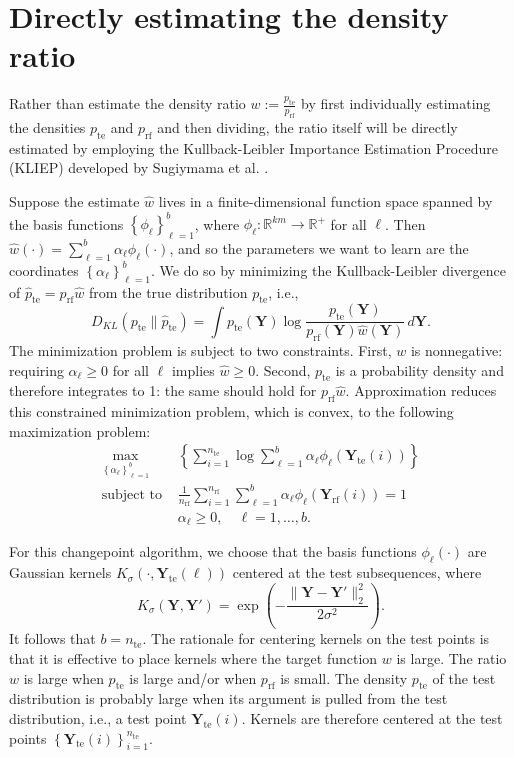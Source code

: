 \documentclass[12pt]{article}
\newcommand\prn[1]{\left( #1 \right)}
\newcommand\set[1]{\left\{ #1 \right\}}
\newcommand\RR{\mathbb{R}}
\newcommand\YY{{\boldsymbol{Y}}}
\newcommand\rf{{\mathrm{rf}}}
\newcommand\te{{\mathrm{te}}}
\begin{document}
\section{Directly estimating the density ratio}

Rather than estimate the density ratio $w:=\frac{p_\te}{p_\rf}$ by first individually estimating the densities $p_\te$ and $p_\rf$ and then dividing, the ratio itself will be directly estimated by employing the Kullback-Leibler Importance Estimation Procedure (KLIEP) developed by Sugiymama et al. \cite{sugiyama2008direct}.

Suppose the estimate $\hat w$ lives in a finite-dimensional function space spanned by the basis functions $\set{\phi_\ell}_{\ell=1}^b$,  where $\phi_\ell\colon\RR^{km}\to\RR^+$ for all $\ell$. Then $\hat w(\cdot)=\sum_{\ell=1}^b\alpha_\ell\phi_\ell(\cdot)$, and so the parameters we want to learn are the coordinates $\set{\alpha_\ell}_{\ell=1}^b$. We do so by minimizing the Kullback-Leibler divergence of $\hat p_\te=p_\rf\hat w$ from the true distribution $p_\te$, i.e.,
$$D_{KL}(p_\te\|\hat p_\te)=\int p_\te(\YY)\log\frac{p_\te(\YY)}{p_\rf(\YY)\hat w(\YY)}\,d\YY.$$
The minimization problem is subject to two constraints. First, $w$ is nonnegative: requiring $\alpha_\ell\ge0$ for all $\ell$ implies $\hat w\ge0$. Second, $p_\te$ is a probability density and therefore integrates to 1: the same should hold for $p_\rf\hat w$. Approximation reduces this constrained minimization problem, which is convex, to the following maximization problem:
\begin{align*}
  \max_{\set{\alpha_\ell}_{\ell=1}^b}&\set{\sum_{i=1}^{n_\te}\log\sum_{\ell=1}^b\alpha_\ell\phi_\ell(\YY_\te(i))}\\
  \text{subject to }&\frac{1}{n_\rf}\sum_{i=1}^{n_\rf}\sum_{\ell=1}^b\alpha_\ell\phi_\ell(\YY_\rf(i))=1\\
  &\alpha_\ell\ge0,\quad\ell=1,\ldots,b.
\end{align*}

For this changepoint algorithm, we choose that the basis functions $\phi_\ell(\cdot)$ are Gaussian kernels $K_\sigma(\cdot,\YY_\te(\ell))$ centered at the test subsequences, where
$$K_\sigma(\YY,\YY')=\exp\prn{-\frac{\|\YY-\YY'\|_2^2}{2\sigma^2}}.$$
It follows that $b=n_\te$. The rationale for centering kernels on the test points is that it is effective to place kernels where the target function $w$ is large. The ratio $w$ is large when $p_\te$ is large and/or when $p_\rf$ is small. The density $p_\te$ of the test distribution is probably large when its argument is pulled from the test distribution, i.e., a test point $\YY_\te(i)$. Kernels are therefore centered at the test points $\set{\YY_\te(i)}_{i=1}^{n_\te}$.
\end{document}
